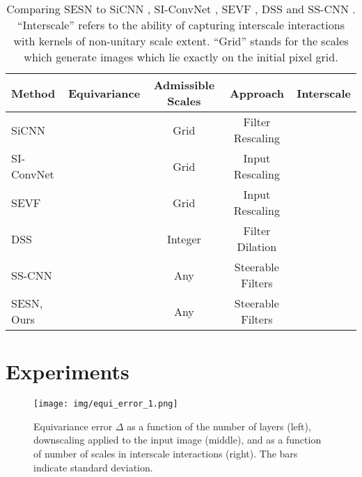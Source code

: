 \documentclass{article} \usepackage{multirow}
\newcommand{\cmark}{\ding{51}}\newcommand{\xmark}{\ding{55}}
\begin{document}
\begin{table}[t]
    \begin{center}
    \begin{tabular}{l|cccc}
    \toprule
    Method     & Equivariance & Admissible Scales & Approach          & Interscale  \\ \midrule
    SiCNN      & \cmark       & Grid              & Filter Rescaling  & \xmark                 \\
    SI-ConvNet & \xmark       & Grid              & Input Rescaling   & \xmark                 \\
    SEVF       & \cmark       & Grid              & Input Rescaling   & \cmark                 \\
    DSS        & \cmark       & Integer           & Filter Dilation  & \cmark                 \\
    SS-CNN     & \xmark       & Any               & Steerable Filters & \xmark                 \\ \midrule
    SESN, Ours & \cmark       & Any               & Steerable Filters & \cmark                 \\ \bottomrule
    \end{tabular}
    \end{center}
    \caption{Comparing SESN to SiCNN \citet{xu2014scale}, SI-ConvNet \citet{kanazawa2014locally}, 
    SEVF \citet{marcos2018scale}, DSS \citet{worrall2019deep} and SS-CNN \citet{ghosh2019scale}.
    ``Interscale'' refers to the ability of capturing interscale interactions with kernels of non-unitary scale extent.
    ``Grid'' stands for the scales which generate images which lie exactly on the initial pixel grid. }
    \label{tab:comparison}
\end{table}


 \section{Experiments}
\label{sec:experiments}

\begin{figure}[h]
    \begin{center}
        \texttt{[image: img/equi\_error\_1.png]}
    \end{center}
    \caption{Equivariance error $\Delta$ as a function of the number of layers (left), downscaling applied to the input image (middle),
    and as a function of number of scales in interscale interactions (right). The bars indicate standard deviation.}
    \label{fig:equi_error}
\end{figure}
\end{document}
